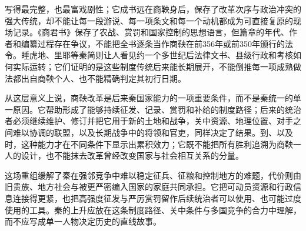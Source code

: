 \begin{sourcenote}[从商鞅故事回到材料边界]
写得最完整，也最富戏剧性；它成书远在商鞅身后，保存了改革次序与政治冲突的强大传统，却不能让每一段游说、每一项条文和每一个动机都成为可直接复原的现场记录。《商君书》保存了农战、赏罚和国家控制的思想语言，但篇章的年代、作者和编纂过程存在争议，不能把全书逐条当作商鞅在前356年或前350年颁行的法令。睡虎地、里耶等秦简则让人看见约一个多世纪后法律文书、县级行政和考核如何实际运转；它们证明的是这些制度传统后来能长期展开，不能倒推每一项成熟做法都出自商鞅个人、也不能精确判定其初行日期。
\end{sourcenote}

从这层意义上说，商鞅改革是后来秦国家能力的一项重要条件，而不是秦统一的单一原因。它帮助形成了能够持续征发、记录、赏罚和补给的制度路径；后来的统治者必须继续维护、修订并把它用于新的土地和战争，关中资源、地理位置、对手之间难以协调的联盟，以及长期战争中的将领和官吏，同样决定了结果。到、以及时，这种能力才在不同条件下显示出累积效力；它既不能把所有胜利追溯为商鞅一人的设计，也不能抹去改革曾经改变国家与社会相互关系的分量。

\begin{turningpoint}
这场重组缓解了秦在强邻竞争中难以稳定征兵、征粮和控制地方的难题，代价则由旧贵族、地方社会与被更严密编入国家的家庭共同承担。它把可动员资源和行政信息连接得更紧，也把高强度征发与严厉赏罚留作后续统治者可以使用、也可能过度使用的工具。秦的上升应放在这条制度路径、关中条件与多国竞争的合力中理解，而不应写成单一人物决定历史的直线故事。
\end{turningpoint}
